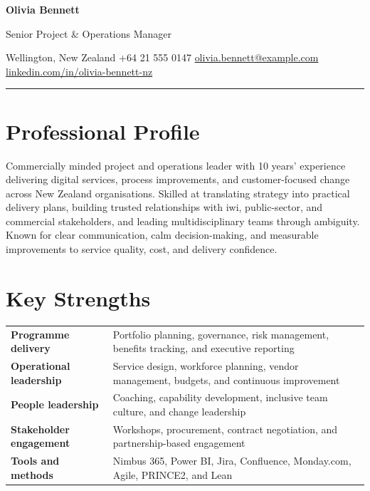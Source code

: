 \documentclass[10pt,a4paper]{article}
\makeatletter
\newcommand{\CandidateName}{Olivia Bennett}
\newcommand{\CandidateTitle}{Senior Project \& Operations Manager}
\newcommand{\CandidateLocation}{Wellington, New Zealand}
\newcommand{\CandidatePhone}{+64 21 555 0147}
\newcommand{\CandidateEmail}{olivia.bennett@example.com}
\newcommand{\CandidateLinkedIn}{linkedin.com/in/olivia-bennett-nz}
\newcommand{\contactsep}{\hspace{0.65em}\textcolor{rulecolour}{\textbar}\hspace{0.65em}}
\newcommand{\skillrow}[2]{%
  \textbf{\color{kiwiblue}#1} & #2\\[3pt]
}
\makeatother
\begin{document}
{\Huge\bfseries\color{kiwiblue}\CandidateName}\par
\vspace{2pt}
{\Large\color{pounamu}\CandidateTitle}\par
\vspace{7pt}
{\small
  \CandidateLocation
  \contactsep \CandidatePhone
  \contactsep \href{mailto:\CandidateEmail}{\CandidateEmail}
  \contactsep \href{https://\CandidateLinkedIn}{\CandidateLinkedIn}
}\par
\vspace{6pt}
{\color{kiwiblue}\rule{\textwidth}{1.6pt}}

\section*{Professional Profile}

Commercially minded project and operations leader with 10 years' experience delivering digital services, process improvements, and customer-focused change across New Zealand organisations. Skilled at translating strategy into practical delivery plans, building trusted relationships with iwi, public-sector, and commercial stakeholders, and leading multidisciplinary teams through ambiguity. Known for clear communication, calm decision-making, and measurable improvements to service quality, cost, and delivery confidence.

\section*{Key Strengths}

\renewcommand{\arraystretch}{1.05}
\begin{tabularx}{\textwidth}{@{}>{\raggedright\arraybackslash}p{}X@{}}
  \skillrow{Programme delivery}{Portfolio planning, governance, risk management, benefits tracking, and executive reporting}
  \skillrow{Operational leadership}{Service design, workforce planning, vendor management, budgets, and continuous improvement}
  \skillrow{People leadership}{Coaching, capability development, inclusive team culture, and change leadership}
  \skillrow{Stakeholder engagement}{Workshops, procurement, contract negotiation, and partnership-based engagement}
  \skillrow{Tools and methods}{Nimbus 365, Power BI, Jira, Confluence, Monday.com, Agile, PRINCE2, and Lean}
\end{tabularx}
\end{document}
